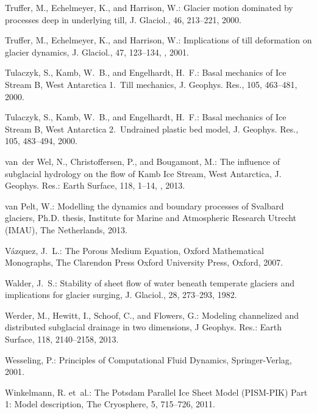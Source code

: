 \documentclass[gmd]{copernicus}   %
\begin{document}
\begin{thebibliography}{68}
Truffer, M., Echelmeyer, K., and Harrison, W.: Glacier motion dominated by
  processes deep in underlying till, J. Glaciol., 46, 213--221, 2000.

Truffer, M., Echelmeyer, K., and Harrison, W.: Implications of till deformation
  on glacier dynamics, J. Glaciol., 47, 123--134,
  , 2001.

Tulaczyk, S., Kamb, W.~B., and Engelhardt, H.~F.: Basal mechanics of {I}ce
  {S}tream {B}, {W}est {A}ntarctica 1.~{T}ill mechanics, J. Geophys. Res., 105,
  463--481, 2000{}.

Tulaczyk, S., Kamb, W.~B., and Engelhardt, H.~F.: Basal mechanics of {I}ce
  {S}tream {B}, {W}est {A}ntarctica 2.~{U}ndrained plastic bed model, J.
  Geophys. Res., 105, 483--494, 2000{}.

van~der Wel, N., Christoffersen, P., and Bougamont, M.: The influence of
  subglacial hydrology on the flow of {K}amb {I}ce {S}tream, {W}est
  {A}ntarctica, J. Geophys. Res.: Earth Surface, 118, 1--14,
  , 2013.

van Pelt, W.: Modelling the dynamics and boundary processes of {S}valbard
  glaciers, Ph.D. thesis, Institute for Marine and Atmospheric Research Utrecht
  (IMAU), The Netherlands, 2013.

V{\'a}zquez, J.~L.: The {P}orous {M}edium {E}quation, Oxford Mathematical
  Monographs, The Clarendon Press Oxford University Press, Oxford, 2007.

Walder, J.~S.: Stability of sheet flow of water beneath temperate glaciers and
  implications for glacier surging, J. Glaciol., 28, 273--293, 1982.

Werder, M., Hewitt, I., Schoof, C., and Flowers, G.: Modeling channelized and
  distributed subglacial drainage in two dimensions, J Geophys. Res.: Earth
  Surface, 118, 2140--2158, 2013.

Wesseling, P.: Principles of {C}omputational {F}luid {D}ynamics,
  Springer-Verlag, 2001.

Winkelmann, R. et~al.: The {P}otsdam {P}arallel {I}ce {S}heet
  {M}odel ({PISM-PIK}) {P}art 1: {M}odel description, The Cryosphere, 5,
  715--726, 2011.
\end{thebibliography}
\end{document}
